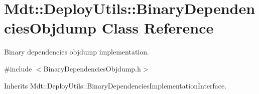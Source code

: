 \hypertarget{class_mdt_1_1_deploy_utils_1_1_binary_dependencies_objdump}{}\section{Mdt\+:\+:Deploy\+Utils\+:\+:Binary\+Dependencies\+Objdump Class Reference}
\label{class_mdt_1_1_deploy_utils_1_1_binary_dependencies_objdump}


Binary dependencies objdump implementation.  




{\ttfamily \#include $<$Binary\+Dependencies\+Objdump.\+h$>$}



Inherits Mdt\+::\+Deploy\+Utils\+::\+Binary\+Dependencies\+Implementation\+Interface.

